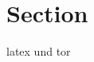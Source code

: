 
\section{Section}

\lipsum[1] \cite{nguyen_machine_2018}

\lipsum[1] \gls{latex} und \acrshort{tor}
